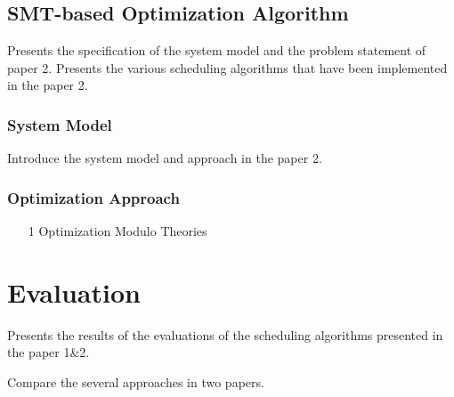 \documentclass[conference]{IEEEtran}
\begin{document}
\subsection{SMT-based Optimization Algorithm} 
Presents the specification of the system model and the problem statement of paper 2.  Presents the various scheduling algorithms that have been implemented in the paper 2. \cite{Hellmanns2021}
\subsubsection{System Model}
Introduce the system model and approach in the paper 2.
\subsubsection{Optimization Approach}
\begin{itemize}
    \item[1] Optimization Modulo Theories
\end{itemize}





\section{Evaluation}
Presents the results of the evaluations of the scheduling algorithms presented in the paper 1\&2. 

Compare the several approaches in two papers.



%
%
%	
\end{document}
